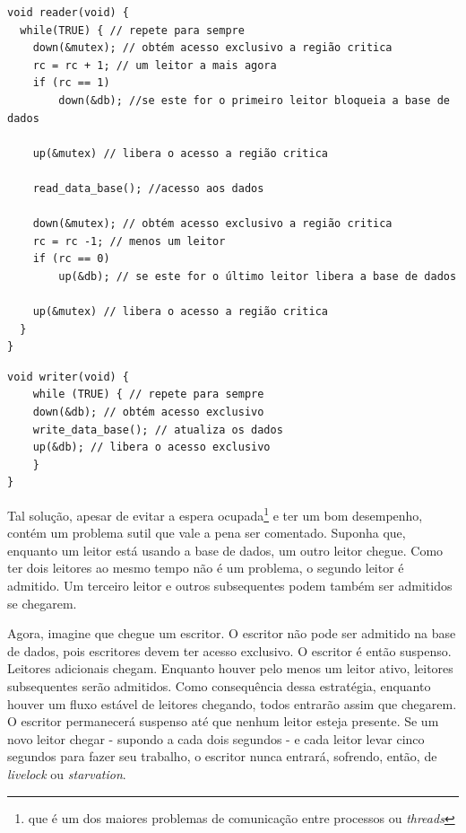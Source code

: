 \begin{minipage}[t]{0.45\linewidth}
\begin{lstlisting}[style=C]
void reader(void) {
  while(TRUE) { // repete para sempre
    down(&mutex); // obtém acesso exclusivo a região critica
    rc = rc + 1; // um leitor a mais agora
    if (rc == 1) 
    	down(&db); //se este for o primeiro leitor bloqueia a base de dados

    up(&mutex) // libera o acesso a região critica

    read_data_base(); //acesso aos dados

    down(&mutex); // obtém acesso exclusivo a região critica
    rc = rc -1; // menos um leitor
    if (rc == 0) 
    	up(&db); // se este for o último leitor libera a base de dados

    up(&mutex) // libera o acesso a região critica
  }
}
\end{lstlisting}
\end{minipage}
%
\begin{minipage}[t]{0.45\linewidth}
\begin{lstlisting}[style=C]
void writer(void) {
	while (TRUE) { // repete para sempre
	down(&db); // obtém acesso exclusivo
	write_data_base(); // atualiza os dados
	up(&db); // libera o acesso exclusivo
	}
}
\end{lstlisting}
\end{minipage}

	Tal solução, apesar de evitar a espera ocupada\footnote{que é um dos maiores problemas de comunicação entre processos ou \textit{threads}} e ter um bom desempenho, contém um problema sutil que vale a pena ser comentado. Suponha que, enquanto um leitor está usando a base de dados, um outro leitor chegue. Como ter dois leitores ao mesmo tempo não é um problema, o segundo leitor é admitido. Um terceiro leitor e outros subsequentes podem também ser admitidos se chegarem.
	
	Agora, imagine que chegue um escritor. O escritor não pode ser admitido na base de dados, pois escritores devem ter acesso exclusivo. O escritor é então suspenso. Leitores adicionais chegam. Enquanto houver pelo menos um leitor ativo, leitores subsequentes serão admitidos. Como consequência dessa estratégia, enquanto houver um fluxo estável de leitores chegando, todos entrarão assim que chegarem. O escritor permanecerá suspenso até que nenhum leitor esteja presente. Se um novo leitor chegar - supondo a cada dois segundos - e cada leitor levar cinco segundos para fazer seu trabalho, o escritor nunca entrará, sofrendo, então, de \textit{livelock} ou \textit{starvation}.
	
